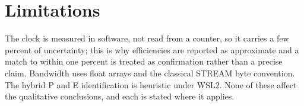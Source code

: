 \section{Limitations}

The clock is measured in software, not read from a counter, so it carries a few
percent of uncertainty; this is why efficiencies are reported as approximate and
a match to within one percent is treated as confirmation rather than a precise
claim. Bandwidth uses float arrays and the classical STREAM byte convention. The
hybrid P and E identification is heuristic under WSL2. None of these affect the
qualitative conclusions, and each is stated where it applies.
